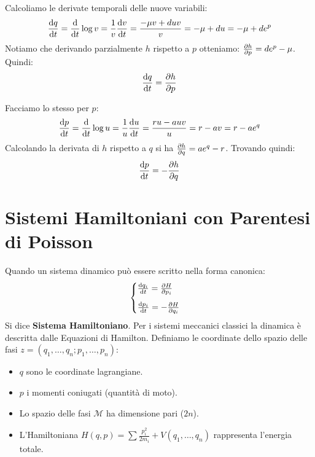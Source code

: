 \documentclass[openany]{book}
\theoremstyle{definition}
\theoremstyle{remark}
\begin{document}
Calcoliamo le derivate temporali delle nuove variabili:
\begin{equation*}
    \dv{q}{t} = \dv{t} \log v = \frac{1}{v}\dv{v}{t} = \frac{-\mu v + duv}{v} = -\mu + du = -\mu + de^p
\end{equation*}
Notiamo che derivando parzialmente $h$ rispetto a $p$ otteniamo: $\pdv{h}{p} = de^p - \mu$. Quindi:
\begin{equation}
    \dv{q}{t} = \pdv{h}{p}
\end{equation}

Facciamo lo stesso per $p$:
\begin{equation*}
    \dv{p}{t} = \dv{t} \log u = \frac{1}{u}\dv{u}{t} = \frac{ru - auv}{u} = r - av = r - ae^q
\end{equation*}
Calcolando la derivata di $h$ rispetto a $q$ si ha $\pdv{h}{q} = ae^q - r$. Trovando quindi:
\begin{equation}
    \dv{p}{t} = -\pdv{h}{q}
\end{equation}


\section*{Sistemi Hamiltoniani con Parentesi di Poisson}


Quando un sistema dinamico può essere scritto nella forma canonica:
\begin{equation}
    \begin{cases}
        \dv{q_i}{t} = \pdv{H}{p_i} \\[8pt]
        \dv{p_i}{t} = -\pdv{H}{q_i}
    \end{cases}
\end{equation}
Si dice \textbf{Sistema Hamiltoniano}. Per i sistemi meccanici classici la dinamica è descritta dalle Equazioni di Hamilton. Definiamo le coordinate dello spazio delle fasi $z = (q_1, \dots, q_n; p_1, \dots, p_n)$:
\begin{itemize}
    \item $q$ sono le coordinate lagrangiane.
    \item $p$ i momenti coniugati (quantità di moto).
    \item Lo spazio delle fasi $\mathcal{M}$ ha dimensione pari ($2n$).
    \item L'Hamiltoniana $H(q,p) = \sum \frac{p_i^2}{2m_i} + V(q_1, \dots, q_n)$ rappresenta l'energia totale.
\end{itemize}
\end{document}
